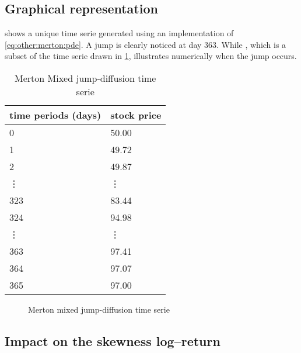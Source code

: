 \documentclass[12pt]{report}
\begin{document}
\subsection{Graphical representation}
\label{sub:other:merton:graphical}   

 shows a unique time serie generated using an implementation of \cref{eq:other:merton:pde}. A jump is clearly noticed at day 363. While
, which is a subset of the time serie drawn in \cref{p:other:merton:path}, illustrates numerically when the jump occurs.

\begin{table}[ht]
\centering
\begin{tabular}{ll}
  \hline
 time periods (days)& stock price\\ 
  \hline
  0   &50.00 \\ 
  1   &49.72 \\ 
  2   &49.87 \\ 
  \vdots & \vdots \\
  323 &83.44 \\ 
  324 &94.98 \\ 
  \vdots & \vdots \\
  363 &97.41 \\ 
  364 &97.07 \\ 
  365 &97.00 \\ 
   \hline
\end{tabular}
\caption{Merton Mixed jump-diffusion time serie}
\label{t:other:merton:path}
\end{table}

\begin{figure}[ht]
  \centering
   
  \caption{Merton mixed jump-diffusion time serie}
  \label{p:other:merton:path}
\end{figure}




\subsection{Impact on the skewness log--return}
\label{sub:MertonSkewness}
\end{document}

